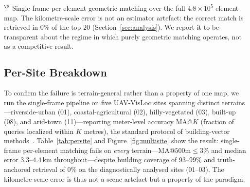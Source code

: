 \documentclass[10pt]{article}
\theoremstyle{plain}
\theoremstyle{definition}
\begin{document}
\begin{table}[htbp]
\par\smallskip
{\footnotesize $^{\P}$ Single-frame per-element geometric matching over the full
$4.8\times10^{5}$-element map. The kilometre-scale error is not an estimator
artefact: the correct match is retrieved in $0\%$ of the top-$20$
(Section~\ref{sec:analysis}). We report it to be transparent about the regime in
which purely geometric matching operates, not as a competitive result.}
\end{table}

\subsection{Per-Site Breakdown}
\label{sec:persite}

To confirm the failure is terrain-general rather than a property of one map, we
run the single-frame pipeline on five UAV-VisLoc sites spanning distinct
terrains---riverside-urban (01), coastal-agricultural (02), hilly-vegetated
(03), built-up (08), and arid-town (11)---reporting meter-level accuracy
$\mathrm{MA@}K$ (fraction of queries localized within $K$ metres), the standard
protocol of building-vector methods~\cite{ouyang2024cfbvm}. Table~\ref{tab:persite}
and Figure~\ref{fig:multisite} show the result: single-frame per-element
matching fails on \emph{every} terrain---$\mathrm{MA@}500\mathrm{m}\!\le\!3\%$
and median error $3.3$--$4.4$\,km throughout---despite building coverage of
$93$--$99\%$ and truth-anchored retrieval of $0\%$ on the diagnostically
analysed sites (01--03). The kilometre-scale error is thus not a scene artefact
but a property of the paradigm.
\end{document}
